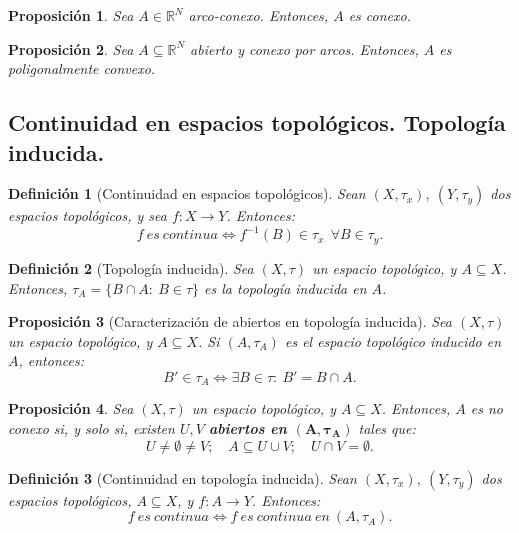 \documentclass[11pt, a4paper, titlepage]{article}
\newcommand{\bm}[1]{\boldsymbol{#1}}
\theoremstyle{theorem-style}
\newtheorem*{nprop}{Proposición}
\theoremstyle{definition-style}
\newtheorem*{ndef}{Definición}
\theoremstyle{remark-style}
\theoremstyle{example-style}
\begin{document}
\begin{nprop}
Sea $A\in \mathbb{R}^N$ arco-conexo. Entonces, $A$ es conexo.
\end{nprop}



\begin{nprop}
Sea $A\subseteq \mathbb{R}^N$ abierto y conexo por arcos. Entonces, $A$ es poligonalmente convexo.
\end{nprop}


\subsection{Continuidad en espacios topológicos. Topología inducida.}

\begin{ndef}[Continuidad en espacios topológicos]
Sean $(X,\tau_x),\ (Y,\tau_y)$ dos espacios topológicos, y sea $f:X\longrightarrow Y$. Entonces: $$f\ es\ continua \iff f^{-1}(B) \in \tau_x \ \ \forall B \in \tau_y.$$
\end{ndef}



\begin{ndef}[Topología inducida]
Sea $(X,\tau)$ un espacio topológico, y $A\subseteq X$. Entonces, $\tau_A = \{B\cap A: \ B \in \tau\}$ es la \textit{topología inducida en $A$}.
\end{ndef}



\begin{nprop}[Caracterización de abiertos en topología inducida]
Sea $(X,\tau)$ un espacio topológico, y $A\subseteq X$. Si $(A,\tau_A)$ es el espacio topológico inducido en $A$, entonces: $$B' \in \tau_A \iff \exists B\in \tau: \ B' = B\cap A.$$
\end{nprop}



\begin{nprop}
Sea $(X,\tau)$ un espacio topológico, y $A\subseteq X$. Entonces, $A$ es no conexo si, y solo si, existen $U,V$ \textbf{abiertos en $\bm{(A,\tau_A)}$} tales que: $$U \ne \emptyset \ne V;\quad A \subseteq U \cup V;\quad U \cap V = \emptyset.$$
\end{nprop}



\begin{ndef}[Continuidad en topología inducida]
Sean $(X,\tau_x),\ (Y,\tau_y)$ dos espacios topológicos, $A\subseteq X$, y $f:A\longrightarrow Y$. Entonces: $$f\ es\ continua \iff f\ es\ continua\ en\ (A,\tau_A).$$
\end{ndef}
\end{document}

